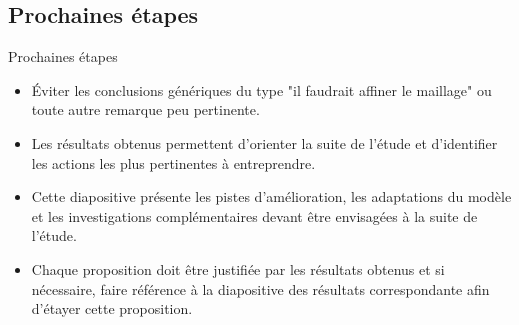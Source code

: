 \subsection{Prochaines étapes}
\label{sec:Prochaines étapes}

\begin{frame}[c]{Prochaines étapes}
  \begin{itemize}
    \item Éviter les conclusions génériques du type "il faudrait affiner le maillage" ou toute autre remarque peu pertinente.
    \item Les résultats obtenus permettent d'orienter la suite de l'étude et d'identifier les actions les plus pertinentes à entreprendre.
    \item Cette diapositive présente les pistes d'amélioration, les adaptations du modèle et les investigations complémentaires devant être envisagées à la suite de l'étude.
    \item Chaque proposition doit être justifiée par les résultats obtenus et si nécessaire, faire référence à la diapositive des résultats correspondante afin d'étayer cette proposition.
  \end{itemize}
\end{frame}
